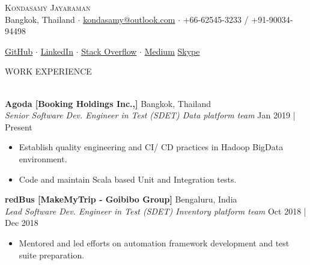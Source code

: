 \documentclass[a4paper]{article}
\newcommand{\lineunder} {
    \vspace*{-8pt} \\
    \hspace*{-18pt} \hrulefill \\
}
\newcommand{\header} [1] {
    {\hspace*{-18pt}\vspace*{6pt} \textsc{#1}}
    \vspace*{-6pt} \lineunder
}
\begin{document}
\vspace*{-50pt}

    

\vspace*{-12pt}
\begin{center}
	{\Huge \scshape {Kondasamy Jayaraman}}\\
	\vspace{1mm}
	Bangkok, Thailand $\cdot$ 
	\faEnvelope \hspace{.5mm} \href{mailto:kondasamy@outlook.com}{kondasamy@outlook.com} $\cdot$ \faMobile \hspace{.5mm} +66-62545-3233 / +91-90034-94498
	
	\faGithub \hspace{.5mm} \href{https://github.com/Kondasamy}{GitHub} $\cdot$
	\faLinkedin \hspace{.5mm} \href{https://www.linkedin.com/in/kondasamy/}{LinkedIn} $\cdot$
	\faStackOverflow \hspace{.5mm} \href{https://stackoverflow.com/users/2094099/kondasamy-jayaraman}{Stack Overflow} $\cdot$
	\faMedium \hspace{.5mm} \href{https://medium.com/@kondasamy}{Medium}
	\faSkype \hspace{.5mm} \href{https://join.skype.com/invite/n0IMYwGkGwQ1}{Skype}\\
\end{center}

\header{WORK EXPERIENCE}
\vspace{1mm}

\textbf{Agoda [Booking Holdings Inc.,]} \hfill Bangkok, Thailand\\
\textit{Senior Software Dev. Engineer in Test (SDET) \textbar{} Data platform team} \hfill Jan 2019 | Present\\
\vspace{-1.5mm}
\begin{itemize} \itemsep 1pt
	\item Establish quality engineering and CI/ CD practices in Hadoop BigData environment.
	\item Code and maintain Scala based Unit and Integration tests.
\end{itemize}

\textbf{redBus [MakeMyTrip - Goibibo Group]} \hfill Bengaluru, India\\
\textit{Lead Software Dev. Engineer in Test (SDET) \textbar{} Inventory platform team} \hfill Oct 2018 | Dec 2018\\
\vspace{-1.5mm}
\begin{itemize} \itemsep 1pt
	\item Mentored and led efforts on automation framework development and test suite preparation.
\end{itemize}
\end{document}
